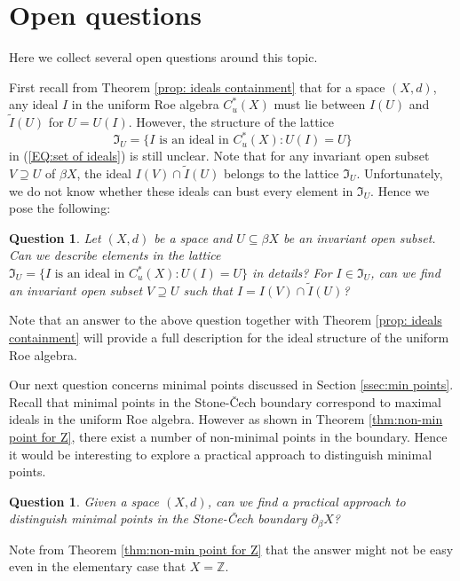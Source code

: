 \documentclass[12pt, a4paper]{amsart}
\numberwithin{equation}{section}
\newtheorem{Q}[thm]{Question}
\theoremstyle{definition}
\theoremstyle{remark}
\def\ZZ{\mathbb{Z}}
\begin{document}
\section{Open questions}\label{sec:open questions}

Here we collect several open questions around this topic.

First recall from Theorem \ref{prop: ideals containment} that for a space $(X,d)$, any ideal $I$ in the uniform Roe algebra $C^*_u(X)$ must lie between $I(U)$ and $\tilde{I}(U)$ for $U=U(I)$. However, the structure of the lattice
\[
\mathfrak{I}_{U}=\{I \mbox{~is~an~ideal~in~} C^*_u(X): U(I)=U\}
\]
in (\ref{EQ:set of ideals}) is still unclear. Note that for any invariant open subset $V \supseteq U$ of $\beta X$, the ideal $I(V) \cap \tilde{I}(U)$ belongs to the lattice $\mathfrak{I}_{U}$. Unfortunately, we do not know whether these ideals can bust every element in $\mathfrak{I}_{U}$. Hence we pose the following:

\begin{Q}\label{Q1}
Let $(X,d)$ be a space and $U \subseteq \beta X$ be an invariant open subset. Can we describe elements in the lattice $\mathfrak{I}_{U}=\{I \mbox{~is~an~ideal~in~} C^*_u(X): U(I)=U\}$ in details? For $I \in \mathfrak{I}_{U}$, can we find an invariant open subset $V \supseteq U$ such that $I = I(V) \cap \tilde{I}(U)$?
\end{Q}

Note that an answer to the above question together with Theorem \ref{prop: ideals containment} will provide a full description for the ideal structure of the uniform Roe algebra.


Our next question concerns minimal points discussed in Section \ref{ssec:min points}. Recall that minimal points in the Stone-\v{C}ech boundary correspond to maximal ideals in the uniform Roe algebra. However as shown in Theorem \ref{thm:non-min point for Z}, there exist a number of non-minimal points in the boundary. Hence it would be interesting to explore a practical approach to distinguish minimal points. 

\begin{Q}
Given a space $(X,d)$, can we find a practical approach to distinguish minimal points in the Stone-\v{C}ech boundary $\partial_\beta X$? 
\end{Q}

Note from Theorem \ref{thm:non-min point for Z} that the answer might not be easy even in the elementary case that $X= \ZZ$.
\end{document}
